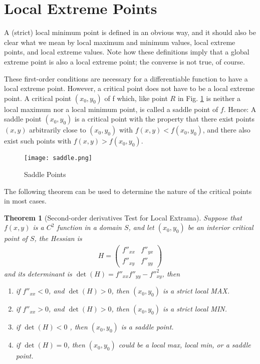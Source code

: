 \documentclass[10pt,a4paper]{book}
\newtheorem{theorem}{Theorem}[section]
\theoremstyle{definition}\newtheorem{definition}{Definition}
\theoremstyle{definition}\newtheorem{fact}{Fact}
\theoremstyle{definition}\newtheorem{ex}{Ex.}
\theoremstyle{definition}\newtheorem{project}{Project}
\theoremstyle{definition}\newtheorem{problem}{Problem}
\theoremstyle{definition}\newtheorem{example}{Example}
\numberwithin{theorem}{chapter}
\numberwithin{corollary}{chapter}
\numberwithin{assumption}{chapter}
\numberwithin{definition}{chapter}
\numberwithin{prop}{chapter}
\numberwithin{notation}{chapter}
\numberwithin{problem}{chapter}
\numberwithin{example}{chapter}
\numberwithin{fact}{chapter}
\numberwithin{ex}{chapter}
\newenvironment{ftheorem}
{\begin{mdframed}\begin{theorem}}
		{\end{theorem}\end{mdframed}}
\begin{document}
	\section{Local Extreme Points}
	A (strict) local minimum point is defined in an obvious way, and it should also be clear what we mean by local maximum and minimum values, local extreme points, and local extreme values. Note how these definitions imply that a global extreme point is also a local extreme point; the converse is not true, of course.
	
	These first-order conditions are necessary for a differentiable function to have a local extreme point. However, a critical point does not have to be a local extreme point. A critical point $(x_0, y_0)$ of f which, like point $R$ in Fig. \ref{fig:saddle} is neither a local maximum nor a local minimum point, is called a saddle point of $f$. Hence: A saddle point $(x_0,y_0)$ is a critical point with the property that there exist points $(x, y)$ arbitrarily close to $(x_0, y_0)$ with $f (x, y) < f (x_0, y_0)$, and there also exist such points with $f (x, y) > f (x_0, y_0)$.
	
	\begin{figure}
		\centering
		\texttt{[image: saddle.png]}
		\caption{Saddle Points}
		\label{fig:saddle}
	\end{figure}
	
	The following theorem can be used to determine the nature of the critical points in most cases.
	
	\begin{ftheorem}[Second-order derivatives Test for Local Extrama] \label{theorem:second_test}
		Suppose that $f (x, y)$ is a $C^2$ function in a domain $S$, and let $(x_0, y_0)$ be an interior critical point of $S$, the Hessian is
		\begin{align*}
			H = \begin{pmatrix}
				f''_{xx} & f''_{yx} \\
				f''_{xy} & f''_{yy} 
			\end{pmatrix}
		\end{align*}
		and its determinant is $\det(H) = f''_{xx} f''_{yy} - f''^2_{xy}$, then
		\begin{enumerate}
			\item if $f''_{xx} < 0$, and $\det(H) > 0$, then  $(x_0, y_0)$  is a strict local MAX.
			\item if $f''_{xx} > 0$, and $\det(H) > 0$, then  $(x_0, y_0)$  is a strict local MIN.
			\item if $\det(H) < 0$ , then  $(x_0, y_0)$  is a saddle point.
			\item if $\det(H) = 0$, then  $(x_0, y_0)$  could be a local max, local min, or a saddle point.
		\end{enumerate}
	\end{ftheorem}
	
\end{document}
